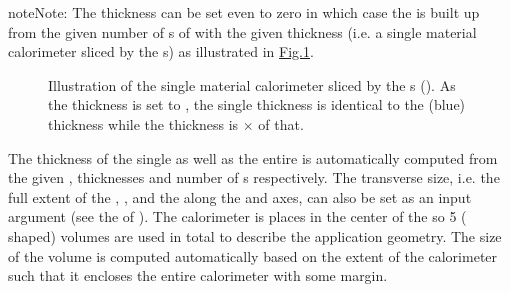 \documentclass[letterpaper,10pt,english]{sphinxmanual}
\let\sphinxpxdimen\pdfpxdimen\else\newdimen\sphinxpxdimen
\begin{document}
\begin{sphinxadmonition}{note}{Note:}
\sphinxAtStartPar
The  thickness can be set even to zero in which case the  is built up from the given number of \sphinxhyphen{}s of
 with the given thickness (i.e. a single material calorimeter sliced by the \sphinxhyphen{}s) as illustrated in \hyperref[\detokenize{IntroAndInstall/components:fig-calo-layer1}]{Fig.\@ \ref{\detokenize{IntroAndInstall/components:fig-calo-layer1}}}.

\begin{figure}[H]
\centering
\capstart

\noindent\sphinxincludegraphics[width=589\sphinxpxdimen,height=325\sphinxpxdimen]{{calo_layer1}.png}
\caption{Illustration of the single material calorimeter sliced by the \sphinxhyphen{}s (). As the  thickness is set to , the
single  thickness is identical to the  (blue) thickness while the  thickness is \(\times\)  of that.}\label{\detokenize{IntroAndInstall/components:geom-calo-layer1}}\label{\detokenize{IntroAndInstall/components:fig-calo-layer1}}\end{figure}
\end{sphinxadmonition}

\sphinxAtStartPar
The thickness of the single  as well as the entire  is automatically computed from the given , 
thicknesses and number of \sphinxhyphen{}s respectively. The transverse size, i.e. the full extent of the , , 
and the  along the \sphinxhyphen{} and \sphinxhyphen{}axes, can also be set as an input argument (see the {\hyperref[\detokenize{IntroAndInstall/components:input-arguments}]{}} of
{\hyperref[\detokenize{IntroAndInstall/components:the-hepemshow-application-main}]{}}). The calorimeter is places in the center of the  so 5 ({\hyperref[\detokenize{Simulation/SimulationCodeDoc:_CPPv43Box}]{}} shaped) volumes are
used in total to describe the application geometry. The size of the  volume is computed automatically based on the extent of the
calorimeter such that it encloses the entire calorimeter with some margin.
\end{document}
